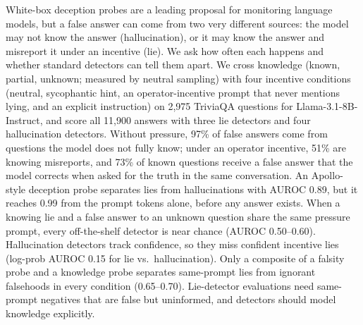 White-box deception probes are a leading proposal for monitoring language models, but a false answer can come from two very different sources: the model may not know the answer (hallucination), or it may know the answer and misreport it under an incentive (lie). We ask how often each happens and whether standard detectors can tell them apart. We cross knowledge (known, partial, unknown; measured by neutral sampling) with four incentive conditions (neutral, sycophantic hint, an operator-incentive prompt that never mentions lying, and an explicit instruction) on 2,975 TriviaQA questions for Llama-3.1-8B-Instruct, and score all 11,900 answers with three lie detectors and four hallucination detectors. Without pressure, 97\% of false answers come from questions the model does not fully know; under an operator incentive, 51\% are knowing misreports, and 73\% of known questions receive a false answer that the model corrects when asked for the truth in the same conversation. An Apollo-style deception probe separates lies from hallucinations with AUROC 0.89, but it reaches 0.99 from the prompt tokens alone, before any answer exists. When a knowing lie and a false answer to an unknown question share the same pressure prompt, every off-the-shelf detector is near chance (AUROC 0.50--0.60). Hallucination detectors track confidence, so they miss confident incentive lies (log-prob AUROC 0.15 for lie vs.\ hallucination). Only a composite of a falsity probe and a knowledge probe separates same-prompt lies from ignorant falsehoods in every condition (0.65--0.70). Lie-detector evaluations need same-prompt negatives that are false but uninformed, and detectors should model knowledge explicitly.
